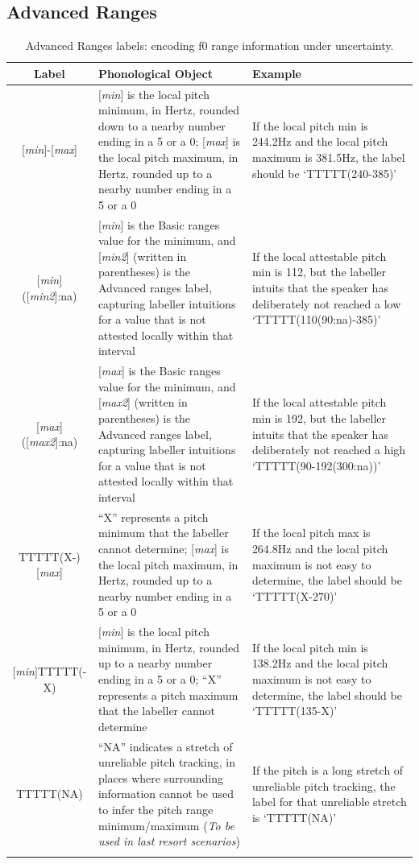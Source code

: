 \documentclass[11pt, twoside]{memoir}
\begin{document}
\subsection*{Advanced Ranges}
\begin{longtable}{cp{.46\linewidth}p{.32\linewidth}} \toprule \textbf{Label} & \textbf{Phonological Object} & \textbf{Example}\tabularnewline
\midrule \endhead
\rowcolor{green}
{[\textit{min}]-[\textit{max}]} &
	{[\textit{min}] is the local pitch minimum, in Hertz, rounded down to a nearby number ending in a 5 or a 0}; {[\textit{max}] is the local pitch maximum, in Hertz, rounded up to a nearby number ending in a 5 or a 0} &
	If the local pitch min is 244.2Hz and the local pitch maximum is 381.5Hz, the label should be ‘TTTTT(240-385)’
	\tabularnewline
{[\textit{min}]([\textit{min2}]:na)} &
	[\textit{min}] is the Basic ranges value for the minimum, and [\textit{min2}] (written in parentheses) is the Advanced ranges label, capturing labeller intuitions for a value that is not attested locally within that interval &
	If the local attestable pitch min is 112, but the labeller intuits that the speaker has deliberately not reached a low ‘TTTTT(110(90:na)-385)’
	\tabularnewline
{[\textit{max}]([\textit{max2}]:na)} &
	[\textit{max}] is the Basic ranges value for the minimum, and [\textit{max2}] (written in parentheses) is the Advanced ranges label, capturing labeller intuitions for a value that is not attested locally within that interval &
	If the local attestable pitch min is 192, but the labeller intuits that the speaker has deliberately not reached a high ‘TTTTT(90-192(300:na))’
	\tabularnewline
{TTTTT(X-)[\textit{max}]} &
	{“X” represents a pitch minimum that the labeller cannot determine}; {[\textit{max}] is the local pitch maximum, in Hertz, rounded up to a nearby number ending in a 5 or a 0}	 &
	If the local pitch max is 264.8Hz and the local pitch maximum is not easy to determine, the label should be ‘TTTTT(X-270)’
	\tabularnewline
{[\textit{min}]TTTTT(-X)} &
	{[\textit{min}] is the local pitch minimum, in Hertz, rounded up to a nearby number ending in a 5 or a 0}; {“X” represents a pitch maximum that the labeller cannot determine}	 &
	If the local pitch min is 138.2Hz and the local pitch maximum is not easy to determine, the label should be ‘TTTTT(135-X)’
	\tabularnewline
TTTTT(NA) &
	“NA” indicates a stretch of unreliable pitch tracking, in places where surrounding information cannot be used to infer the pitch range minimum\slash maximum (\textit{To be used in last resort scenarios}) &
	If the pitch is a long stretch of unreliable pitch tracking, the label for that unreliable stretch is ‘TTTTT(NA)’
	\tabularnewline
\bottomrule 
\caption{Advanced Ranges labels: encoding f0 range information under uncertainty.}
\end{longtable}
\end{document}
